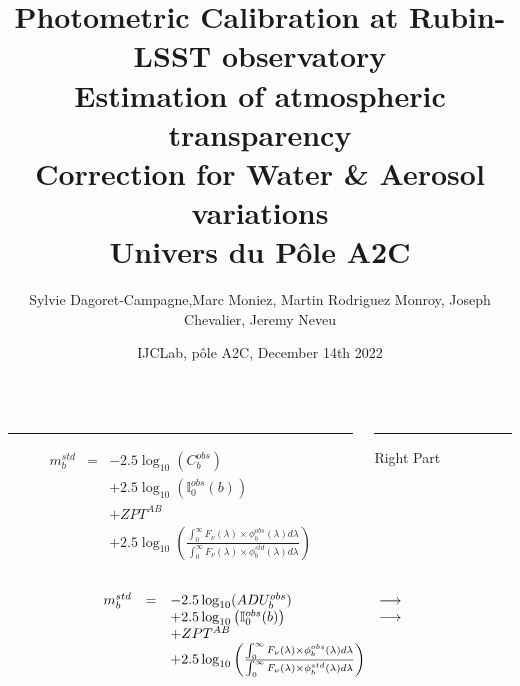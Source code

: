 \documentclass{beamer}
\title[Atmospheric transparency at LSST Obs]{\large Photometric Calibration at Rubin-LSST observatory \\
Estimation of atmospheric transparency \\ Correction for Water \& Aerosol variations\\
{\small Univers du Pôle A2C}}
\author[S. Dagoret-Campagne]{
Sylvie Dagoret-Campagne,Marc Moniez, Martin Rodriguez Monroy, Joseph Chevalier,
Jeremy Neveu
}
\institute[IJCLab]{
  IJCLab,
  CNRS/IN2P3 \& Université Paris-Saclay,
  Orsay, France }
\date[IJCLab, Dec 14th 2022]{IJCLab, pôle A2C, December 14th 2022}
\begin{document}
\begin{frame}
  \titlepage
\end{frame}



\begin{frame}
\begin{columns}[T] %
\begin{column}{.48\textwidth}
\color{red}\rule{\linewidth}{4pt}

\begin{eqnarray}
m_b^{std} & = &  -2.5 \log_{10}(C_b^{obs}) \nonumber \\ 
& & + 2.5 \log_{10}\left(\mathbb{I}_0^{obs}(b)\right) \nonumber \\
& & + ZPT^{AB}   \nonumber \\
& & + 2.5 \log_{10} 
	\left( 
	\frac{\int_0^\infty F_\nu(\lambda) \times \phi_b^{obs}(\lambda) d\lambda }{\int_0^\infty F_\nu(\lambda) \times \phi_b^{std}(\lambda) d\lambda} 
	\right)
\end{eqnarray}


\end{column}%
\hfill%
\begin{column}{.48\textwidth}
\color{blue}\rule{\linewidth}{4pt}

Right Part
\end{column}%
\end{columns}
\end{frame}


\begin{frame}

$$
\begin{array}{lcl c r}
m_b^{std} & = &  -2.5 \log_{10}(ADU_b^{obs}) & \longrightarrow &  \\ 
& & + 2.5 \log_{10}\left(\mathbb{I}_0^{obs}(b)\right) & \longrightarrow \\
& & + ZPT^{AB}   \nonumber \\
& & + 2.5 \log_{10} 
	\left( 
	\frac{\int_0^\infty F_\nu(\lambda) \times \phi_b^{obs}(\lambda) d\lambda }{\int_0^\infty F_\nu(\lambda) \times \phi_b^{std}(\lambda) d\lambda} 
	\right)
\end{array}
$$
\end{frame}

\end{document}

